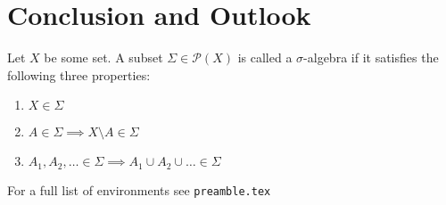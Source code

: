 \chapter{Conclusion and Outlook}
\label{ch:conclusion}

\Blindtext
\blindtext

\begin{definition}
    Let $X$ be some set. A subset $\Sigma \in \mathcal{P}\left(X\right)$ is called a
    $\sigma$-algebra if it satisfies the following three properties:
    \begin{enumerate}
        \item $X \in \Sigma$
        \item $A \in \Sigma \implies X \setminus A \in \Sigma$
        \item $A_1,A_2,\dots \in \Sigma \implies A_1 \cup A_2 \cup \dots \in \Sigma$
    \end{enumerate}
\end{definition}
For a full list of environments see \texttt{preamble.tex}

